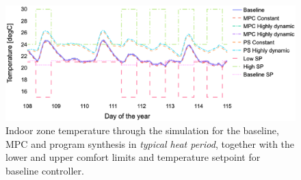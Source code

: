 \begin{figure}
  \includegraphics[width=\linewidth]{images/boptest/Fig7.eps}
\caption{Indoor zone temperature through the simulation for the baseline, MPC and program synthesis in \emph{typical heat period}, together with the lower and upper comfort limits and temperature setpoint for baseline controller.}
\label{fig:temp-typical}       %
\end{figure}